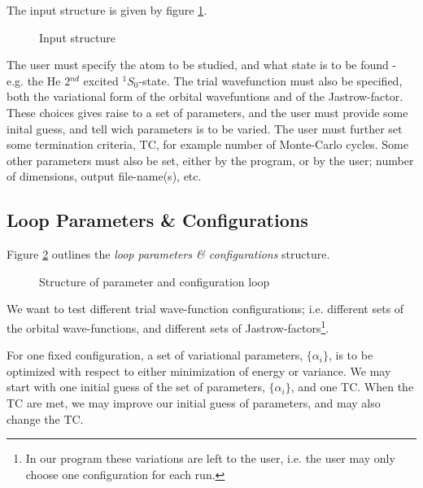 The input structure is given by figure \ref{input_stucture}.

\begin{figure}[hbtp]
\begin{center}
  \caption{Input structure}
  \label{input_stucture}
\end{center}
\end{figure}

The user must specify the atom to be studied, and what state is to be
found - e.g. the He 2$^{nd}$ excited $^1S_0$-state. The trial wavefunction
must also be specified, both the variational form of the orbital
wavefuntions and of the Jastrow-factor. These choices gives raise to a
set of parameters, and the user must provide some inital guess, and
tell wich parameters is to be varied. The user must further set some
termination criteria, TC, for example number of Monte-Carlo
cycles. Some other parameters must also be set, either by the program,
or by the user; number of dimensions, output file-name(s), etc.


\subsection{Loop Parameters \& Configurations}

Figure \ref{loop_parameters_config} outlines the \emph{loop parameters \&
configurations} structure.

\begin{figure}[hbtp]
\begin{center}
  \caption{Structure of parameter and configuration loop}
  \label{loop_parameters_config}
\end{center}
\end{figure}

We want to test different trial wave-function configurations;
i.e. different sets of the orbital wave-functions, and different sets
of Jastrow-factors\footnote{In our program these variations are left
  to the user, i.e. the user may only choose one configuration for
  each run.}.  \newline

For one fixed configuration, a set of variational
parameters, $\{\alpha_i\}$, is to be optimized with respect to either
minimization of energy or variance. We may start with one initial
guess of the set of parameters, $\{\alpha_i\}$, and one TC. When the
TC are met, we may improve our initial guess of parameters, and may
also change the TC. \newline 

